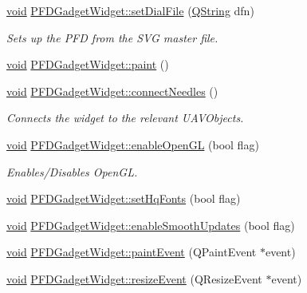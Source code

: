 \begin{DoxyCompactItemize}
\item 
\hyperlink{group___u_a_v_objects_plugin_ga444cf2ff3f0ecbe028adce838d373f5c}{void} \hyperlink{group___o_p_map_plugin_ga2de7c848eacd359fc56a4c2a8c2b6aaf}{P\-F\-D\-Gadget\-Widget\-::set\-Dial\-File} (\hyperlink{group___u_a_v_objects_plugin_gab9d252f49c333c94a72f97ce3105a32d}{Q\-String} dfn)
\begin{DoxyCompactList}\small\item\em Sets up the P\-F\-D from the S\-V\-G master file. \end{DoxyCompactList}\item 
\hyperlink{group___u_a_v_objects_plugin_ga444cf2ff3f0ecbe028adce838d373f5c}{void} \hyperlink{group___o_p_map_plugin_ga62f5dc20f4d0cbc357f70b0661484695}{P\-F\-D\-Gadget\-Widget\-::paint} ()
\item 
\hyperlink{group___u_a_v_objects_plugin_ga444cf2ff3f0ecbe028adce838d373f5c}{void} \hyperlink{group___o_p_map_plugin_ga0fa94b6084a622184f38a1ef0d259792}{P\-F\-D\-Gadget\-Widget\-::connect\-Needles} ()
\begin{DoxyCompactList}\small\item\em Connects the widget to the relevant U\-A\-V\-Objects. \end{DoxyCompactList}\item 
\hyperlink{group___u_a_v_objects_plugin_ga444cf2ff3f0ecbe028adce838d373f5c}{void} \hyperlink{group___o_p_map_plugin_gadbda4e66095d596d888dbbb05e4edbcd}{P\-F\-D\-Gadget\-Widget\-::enable\-Open\-G\-L} (bool flag)
\begin{DoxyCompactList}\small\item\em Enables/\-Disables Open\-G\-L. \end{DoxyCompactList}\item 
\hyperlink{group___u_a_v_objects_plugin_ga444cf2ff3f0ecbe028adce838d373f5c}{void} \hyperlink{group___o_p_map_plugin_gab8b36af02b4938286d29131fbc633744}{P\-F\-D\-Gadget\-Widget\-::set\-Hq\-Fonts} (bool flag)
\item 
\hyperlink{group___u_a_v_objects_plugin_ga444cf2ff3f0ecbe028adce838d373f5c}{void} \hyperlink{group___o_p_map_plugin_ga2c92de52a19bc7483773b7cb14c118f6}{P\-F\-D\-Gadget\-Widget\-::enable\-Smooth\-Updates} (bool flag)
\item 
\hyperlink{group___u_a_v_objects_plugin_ga444cf2ff3f0ecbe028adce838d373f5c}{void} \hyperlink{group___o_p_map_plugin_gaf2685b40cf25a74f35cc9829ca64c774}{P\-F\-D\-Gadget\-Widget\-::paint\-Event} (Q\-Paint\-Event $\ast$event)
\item 
\hyperlink{group___u_a_v_objects_plugin_ga444cf2ff3f0ecbe028adce838d373f5c}{void} \hyperlink{group___o_p_map_plugin_gabdb991171226a4eea59b92bc2daf7bc9}{P\-F\-D\-Gadget\-Widget\-::resize\-Event} (Q\-Resize\-Event $\ast$event)

\end{DoxyCompactItemize}
